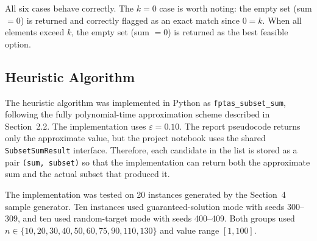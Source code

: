 \documentclass[12pt,a4paper]{article}
\theoremstyle{definition}
\begin{document}
All six cases behave correctly. The $k = 0$ case is worth noting: the empty
set (sum $= 0$) is returned and correctly flagged as an exact match since
$0 = k$. When all elements exceed $k$, the empty set (sum $= 0$) is returned
as the best feasible option.

\subsection{Heuristic Algorithm}


The heuristic algorithm was implemented in Python as \texttt{fptas\_subset\_sum},
following the fully polynomial-time approximation scheme described in Section~2.2.
The implementation uses \(\varepsilon = 0.10\). The report pseudocode returns only the
approximate value, but the project notebook uses the shared \texttt{SubsetSumResult}
interface. Therefore, each candidate in the list is stored as a pair \texttt{(sum, subset)}
so that the implementation can return both the approximate sum and the actual subset
that produced it.

The implementation was tested on 20 instances generated by the Section~4 sample
generator. Ten instances used guaranteed-solution mode with seeds 300--309, and ten
used random-target mode with seeds 400--409. Both groups used
\(n \in \{10,20,30,40,50,60,75,90,110,130\}\) and value range \([1,100]\).
\end{document}
